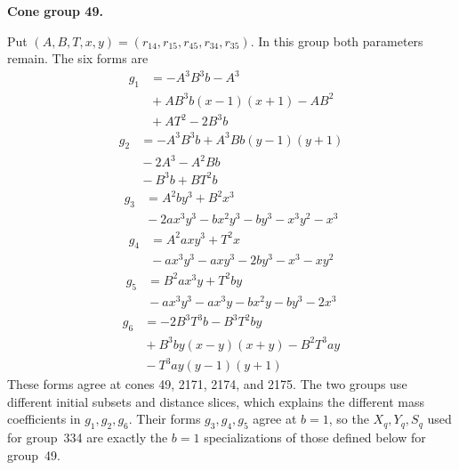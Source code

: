 \documentclass[11pt]{amsart}
\newcommand{\topic}[1]{\par\addvspace{1.4ex}\noindent\textbf{#1}\par\nobreak\smallskip\noindent}
\theoremstyle{definition}\newtheorem{definition}[theorem]{Definition}\theoremstyle{remark}\newtheorem{remark}[theorem]{Remark}
\begin{document}
\topic{Cone group 49.} Put $(A,B,T,x,y)=(r_{14},r_{15},r_{45},r_{34},r_{35})$. In this group both parameters remain. The six forms are
\[
\begin{aligned} g_{1}&=- A^{3} B^{3} b -  A^{3}\\ &{}+ A B^{3} b \left(x - 1\right) \left(x + 1\right) -  A B^{2}\\ &{}+ A T^{2} -  2 B^{3} b\end{aligned}
\]
\[
\begin{aligned} g_{2}&=- A^{3} B^{3} b + A^{3} B b \left(y - 1\right) \left(y + 1\right)\\ &{}-  2 A^{3} -  A^{2} B b\\ &{}-  B^{3} b + B T^{2} b\end{aligned}
\]
\[
\begin{aligned} g_{3}&=A^{2} b y^{3} + B^{2} x^{3}\\ &{}-  2 a x^{3} y^{3} - b x^{2} y^{3} - b y^{3} - x^{3} y^{2} - x^{3}\end{aligned}
\]
\[
\begin{aligned} g_{4}&=A^{2} a x y^{3} + T^{2} x\\ &{}-  a x^{3} y^{3} - a x y^{3} - 2 b y^{3} - x^{3} - x y^{2}\end{aligned}
\]
\[
\begin{aligned} g_{5}&=B^{2} a x^{3} y + T^{2} b y\\ &{}-  a x^{3} y^{3} - a x^{3} y - b x^{2} y - b y^{3} - 2 x^{3}\end{aligned}
\]
\[
\begin{aligned} g_{6}&=- 2 B^{3} T^{3} b -  B^{3} T^{2} b y\\ &{}+ B^{3} b y \left(x - y\right) \left(x + y\right) -  B^{2} T^{3} a y\\ &{}-  T^{3} a y \left(y - 1\right) \left(y + 1\right)\end{aligned}
\]
These forms agree at cones 49, 2171, 2174, and 2175. The two groups use different initial subsets and distance slices, which explains the different mass coefficients in $g_1,g_2,g_6$. Their forms $g_3,g_4,g_5$ agree at $b=1$, so the $X_q,Y_q,S_q$ used for group~334 are exactly the $b=1$ specializations of those defined below for group~49.
\end{document}
